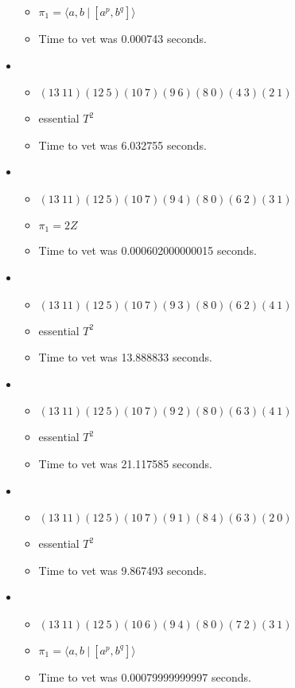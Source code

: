 \documentclass{article}
\begin{document}
\begin{itemize}
\begin{itemize}
      \item $\pi_1 = \langle a,b\ |\ [a^p,b^q]\rangle$
      \item Time to vet was 0.000743 seconds.
\end{itemize}
\item \begin{itemize}
      \item $(13\ 11)(12\ 5)(10\ 7)(9\ 6)(8\ 0)(4\ 3)(2\ 1)$
      \item essential $T^2$
      \item Time to vet was 6.032755 seconds.
\end{itemize}
\item \begin{itemize}
      \item $(13\ 11)(12\ 5)(10\ 7)(9\ 4)(8\ 0)(6\ 2)(3\ 1)$
      \item $\pi_1 =2 Z$
      \item Time to vet was 0.000602000000015 seconds.
\end{itemize}
\item \begin{itemize}
      \item $(13\ 11)(12\ 5)(10\ 7)(9\ 3)(8\ 0)(6\ 2)(4\ 1)$
      \item essential $T^2$
      \item Time to vet was 13.888833 seconds.
\end{itemize}
\item \begin{itemize}
      \item $(13\ 11)(12\ 5)(10\ 7)(9\ 2)(8\ 0)(6\ 3)(4\ 1)$
      \item essential $T^2$
      \item Time to vet was 21.117585 seconds.
\end{itemize}
\item \begin{itemize}
      \item $(13\ 11)(12\ 5)(10\ 7)(9\ 1)(8\ 4)(6\ 3)(2\ 0)$
      \item essential $T^2$
      \item Time to vet was 9.867493 seconds.
\end{itemize}
\item \begin{itemize}
      \item $(13\ 11)(12\ 5)(10\ 6)(9\ 4)(8\ 0)(7\ 2)(3\ 1)$
      \item $\pi_1 = \langle a,b\ |\ [a^p,b^q]\rangle$
      \item Time to vet was 0.00079999999997 seconds.

\end{itemize}
\end{itemize}
\end{document}
